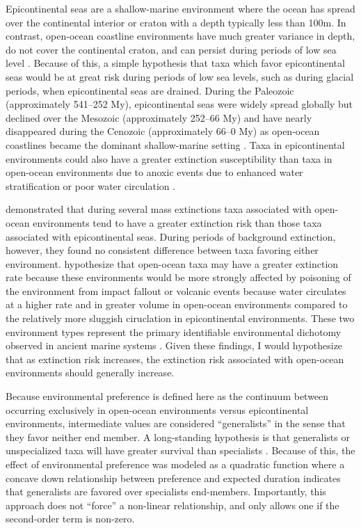 \documentclass[11pt]{article}
\begin{document}
Epicontinental seas are a shallow-marine environment where the ocean has spread over the continental interior or craton with a depth typically less than 100m. In contrast, open-ocean coastline environments have much greater variance in depth, do not cover the continental craton, and can persist during periods of low sea level \citep{Miller2009a}. Because of this, a simple hypothesis that taxa which favor epicontinental seas would be at great risk during periods of low sea levels, such as during glacial periods, when epicontinental seas are drained. During the Paleozoic (approximately 541--252 My), epicontinental seas were widely spread globally but declined over the Mesozoic (approximately 252--66 My) and have nearly disappeared during the Cenozoic (approximately 66--0 My) as open-ocean coastlines became the dominant shallow-marine setting \citep{Sheehan2001b,Peters2008,Miller2009a,Johnson1974}. Taxa in epicontinental environments could also have a greater extinction susceptibility than taxa in open-ocean environments due to anoxic events due to enhanced water stratification or poor water circulation \citep{Peters2007}.

\citet{Miller2009a} demonstrated that during several mass extinctions taxa associated with open-ocean environments tend to have a greater extinction risk than those taxa associated with epicontinental seas. During periods of background extinction, however, they found no consistent difference between taxa favoring either environment. \citet{Miller2009a} hypothesize that open-ocean taxa may have a greater extinction rate because these environments would be more strongly affected by poisoning of the environment from impact fallout or volcanic events because water circulates at a higher rate and in greater volume in open-ocean environments compared to the relatively more sluggish ciruclation in epicontinental environments. These two environment types represent the primary identifiable environmental dichotomy observed in ancient marine systems \citep{Miller2009a,Sheehan2001b}. Given these findings, I would hypothesize that as extinction risk increases, the extinction risk associated with open-ocean environments should generally increase. 

Because environmental preference is defined here as the continuum between occurring exclusively in open-ocean environments versus epicontinental environments, intermediate values are considered ``generalists'' in the sense that they favor neither end member. A long-standing hypothesis is that generalists or unspecialized taxa will have greater survival than specialists \citep{Simpson1944,Liow2004a,Liow2007b,Nurnberg2013a,Nurnberg2015,Baumiller1993,Smits2015}. Because of this, the effect of environmental preference was modeled as a quadratic function where a concave down relationship between preference and expected duration indicates that generalists are favored over specialists end-members. Importantly, this approach does not ``force'' a non-linear relationship, and only allows one if the second-order term is non-zero.
\end{document}
